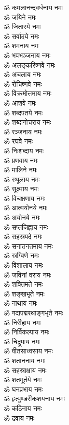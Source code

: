 \begin{multicols}{2}
\begin{flushleft}
ॐ कमलानन्दवर्धनाय नमः\\
ॐ जयिने नमः\hfill{}\\
ॐ जितारये नमः\\
ॐ सर्वादये नमः\\
ॐ शमनाय नमः\\
ॐ भवभञ्जनाय नमः\\
ॐ अलङ्करिष्णवे नमः\\
ॐ अचलाय नमः\\
ॐ रोचिष्णवे नमः\\
ॐ विक्रमोत्तमाय नमः\\
ॐ आशवे नमः\\
ॐ शब्दपतये नमः\hfill{}\\
ॐ शब्दागोचराय नमः\\
ॐ रञ्जनाय नमः\\
ॐ रघवे नमः\\
ॐ निःशब्दाय नमः\\
ॐ प्रणवाय नमः\\
ॐ मालिने नमः\\
ॐ स्थूलाय नमः\\
ॐ सूक्ष्माय नमः\\
ॐ विचक्षणाय नमः\\
ॐ आत्मयोनये नमः\hfill{}\\
ॐ अयोनये नमः\\
ॐ सप्तजिह्वाय नमः\\
ॐ सहस्रपदे नमः\\
ॐ सनातनतमाय नमः\\
ॐ स्रग्विणे नमः\\
ॐ विशालाय नमः\\
ॐ जविनां वराय नमः\\
ॐ शक्तिमते नमः\\
ॐ शङ्खभृते नमः\\
ॐ नाथाय नमः\hfill{}\\
ॐ गदापद्मरथाङ्गभृते नमः\\
ॐ निरीहाय नमः\\
ॐ निर्विकल्पाय नमः\\
ॐ चिद्रूपाय नमः\\
ॐ वीतसाध्वसाय नमः\\
ॐ शताननाय नमः\\
ॐ सहस्राक्षाय नमः\\
ॐ शतमूर्तये नमः\\
ॐ घनप्रभाय नमः\\
ॐ हृत्पुण्डरीकशयनाय नमः\hfill{}\\
ॐ कठिनाय नमः\\
ॐ द्रवाय नमः\\

\end{flushleft}
\end{multicols}
